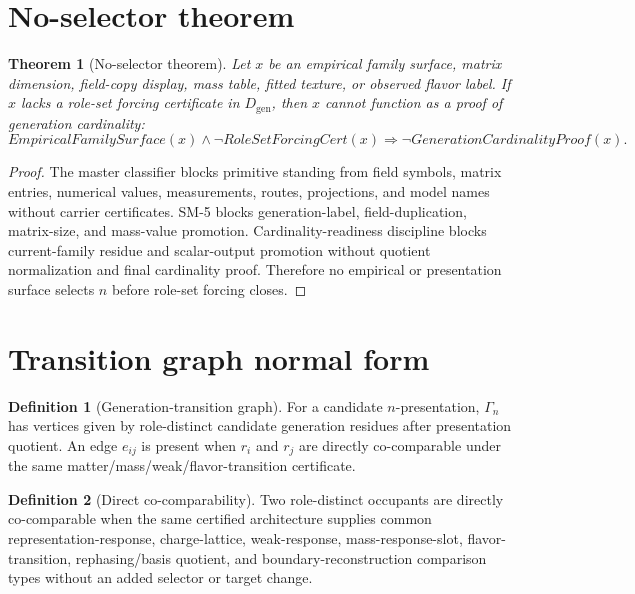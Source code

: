\documentclass[11pt]{article}
\newcommand{\Dgen}{D_{\mathrm{gen}}}
\theoremstyle{definition}
\newtheorem{definition}{Definition}[section]
\theoremstyle{plain}
\newtheorem{theorem}{Theorem}[section]
\theoremstyle{remark}
\begin{document}
\section{No-selector theorem}

\begin{theorem}[No-selector theorem]
Let \(x\) be an empirical family surface, matrix dimension, field-copy display, mass table, fitted texture, or observed flavor label. If \(x\) lacks a role-set forcing certificate in \(\Dgen\), then \(x\) cannot function as a proof of generation cardinality:
\[
EmpiricalFamilySurface(x)\wedge \neg RoleSetForcingCert(x)\Rightarrow \neg GenerationCardinalityProof(x).
\]
\end{theorem}
\begin{proof}
The master classifier blocks primitive standing from field symbols, matrix entries, numerical values, measurements, routes, projections, and model names without carrier certificates. SM-5 blocks generation-label, field-duplication, matrix-size, and mass-value promotion. Cardinality-readiness discipline blocks current-family residue and scalar-output promotion without quotient normalization and final cardinality proof. Therefore no empirical or presentation surface selects \(n\) before role-set forcing closes.
\end{proof}

\section{Transition graph normal form}

\begin{definition}[Generation-transition graph]
For a candidate \(n\)-presentation, \(\Gamma_n\) has vertices given by role-distinct candidate generation residues after presentation quotient. An edge \(e_{ij}\) is present when \(r_i\) and \(r_j\) are directly co-comparable under the same matter/mass/weak/flavor-transition certificate.
\end{definition}

\begin{definition}[Direct co-comparability]
Two role-distinct occupants are directly co-comparable when the same certified architecture supplies common representation-response, charge-lattice, weak-response, mass-response-slot, flavor-transition, rephasing/basis quotient, and boundary-reconstruction comparison types without an added selector or target change.
\end{definition}
\end{document}
